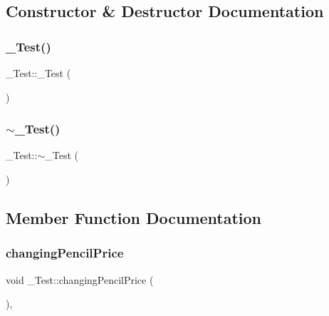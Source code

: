\subsection{Constructor \& Destructor Documentation}
\mbox{\label{class__Test_a03ecfe4fd048c42338c5c54f73d830e2}} 
\subsubsection{\texorpdfstring{\+\_\+\+Test()}{\_Test()}}
{\footnotesize\ttfamily \+\_\+\+Test\+::\+\_\+\+Test (\begin{DoxyParamCaption}{ }\end{DoxyParamCaption})}

\mbox{\label{class__Test_ac861d8bc0d139b86c2f30528d8c1bbbc}} 
\subsubsection{\texorpdfstring{$\sim$\+\_\+\+Test()}{~\_Test()}}
{\footnotesize\ttfamily \+\_\+\+Test\+::$\sim$\+\_\+\+Test (\begin{DoxyParamCaption}{ }\end{DoxyParamCaption})}



\subsection{Member Function Documentation}
\mbox{\label{class__Test_a9cabdf9e5c265487d99174166d9206ff}} 
\subsubsection{\texorpdfstring{changing\+Pencil\+Price}{changingPencilPrice}}
{\footnotesize\ttfamily void \+\_\+\+Test\+::changing\+Pencil\+Price (\begin{DoxyParamCaption}{ }\end{DoxyParamCaption})\hspace{0.3cm}{\ttfamily [private]}, {\ttfamily [slot]}}

